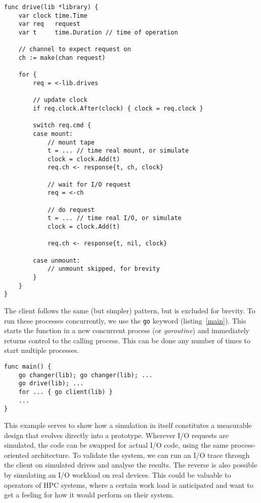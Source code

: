 \begin{lstlisting}[caption={Tape drive},label=drive]
func drive(lib *library) {
    var clock time.Time
    var req   request
    var t     time.Duration // time of operation

    // channel to expect request on
    ch := make(chan request)

    for {
        req = <-lib.drives

        // update clock
        if req.clock.After(clock) { clock = req.clock }

        switch req.cmd {
        case mount:
            // mount tape
            t = ... // time real mount, or simulate
            clock = clock.Add(t)
            req.ch <- response{t, ch, clock}

            // wait for I/O request
            req = <-ch

            // do request
            t = ... // time real I/O, or simulate
            clock = clock.Add(t)

            req.ch <- response{t, nil, clock}

        case unmount:
            // unmount skipped, for brevity
        }
    }
}
\end{lstlisting}

The client follows the same (but simpler) pattern, but is excluded for brevity.
To run these processes concurrently, we use the \lstinline{go} keyword
(listing~\ref{main}). This starts the function in a new concurrent process (or
\emph{goroutine}) and immediately returns control to the calling process. This
can be done any number of times to start multiple processes.

\begin{lstlisting}[caption={Simulation entry point},label=main]
func main() {
    go changer(lib); go changer(lib); ...
    go drive(lib); ...
    for ... { go client(lib) }
    ...
}
\end{lstlisting}

This example serves to show how a simulation in itself constitutes a measurable
design that evolves directly into a prototype. Wherever I/O requests are
simulated, the code can be swapped for actual I/O code, using the same
process-oriented architecture. To validate the system, we can run an I/O trace
through the client on simulated drives and analyse the results. The reverse is
also possible by simulating an I/O workload on real devices. This could be
valuable to operators of HPC systems, where a certain work load is anticipated
and want to get a feeling for how it would perform on their system.




